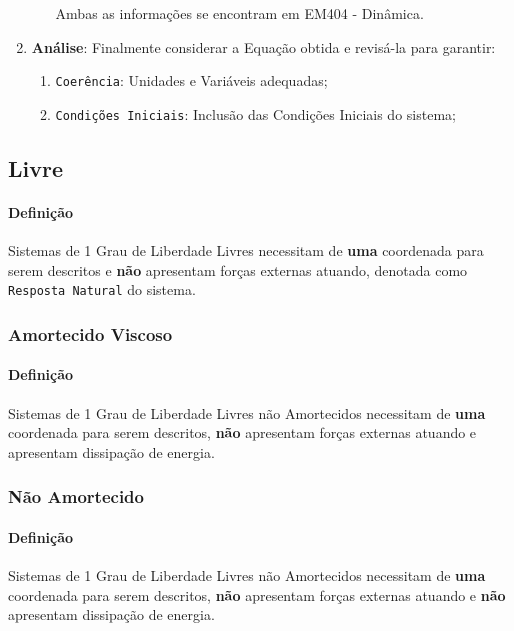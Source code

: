 \documentclass{article}
\begin{document}
\begin{enumerate}[rightmargin = \leftmargin]
\begin{enumerate}[rightmargin = \leftmargin, noitemsep]
            Ambas as informações se encontram em EM404 - Dinâmica.
        \end{enumerate}

        \item \textbf{Análise}: Finalmente considerar a Equação obtida e revisá-la para garantir:
        \begin{enumerate}[rightmargin = \leftmargin, noitemsep]
            \item \texttt{Coerência}: Unidades e Variáveis adequadas;
            \item \texttt{Condições Iniciais}: Inclusão das Condições Iniciais do sistema;
        \end{enumerate}
    \end{enumerate}




\newpage\subsection{Livre}
    \paragraph{Definição}Sistemas de 1 Grau de Liberdade Livres necessitam de \textbf{uma} coordenada para serem descritos e \textbf{não} apresentam forças externas atuando, denotada como \texttt{Resposta Natural} do sistema.

\subsubsection{Amortecido Viscoso}
    \paragraph{Definição}Sistemas de 1 Grau de Liberdade Livres não Amortecidos necessitam de \textbf{uma} coordenada para serem descritos, \textbf{não} apresentam forças externas atuando e apresentam dissipação de energia.

\subsubsection{Não Amortecido}
    \paragraph{Definição}Sistemas de 1 Grau de Liberdade Livres não Amortecidos necessitam de \textbf{uma} coordenada para serem descritos, \textbf{não} apresentam forças externas atuando e \textbf{não} apresentam dissipação de energia.
\end{document}
